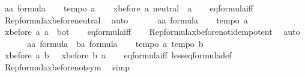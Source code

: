 \begin{isabellebody}
\ a{\isacharcolon}{\isacharcolon}{\isachardoublequoteopen}{\isacharprime}a\ formula{\isachardoublequoteclose}\isanewline
\ \ \isamarkupfalse%
\ {\isachardoublequoteopen}tempo{}\ a{\isachardoublequoteclose}\isanewline
\ \ \isamarkupfalse%
\ {\isachardoublequoteopen}xbefore\ a\ neutral\ {\isacharequal}\ a{\isachardoublequoteclose}\isanewline
\ \ \isamarkupfalse%
\ eq{\isacharunderscore}formula{\isacharunderscore}iff\isanewline
\ \ \isamarkupfalse%
\ Rep{\isacharunderscore}formula{\isacharunderscore}xbefore{\isacharunderscore}neutral{\isacharunderscore}{}\ \isamarkupfalse%
\ auto\isanewline
\ \ \isamarkupfalse%
\isanewline
\ \ \isamarkupfalse%
\ a{\isacharcolon}{\isacharcolon}{\isachardoublequoteopen}{\isacharprime}a\ formula{\isachardoublequoteclose}\isanewline
\ \ \isamarkupfalse%
\ {\isachardoublequoteopen}tempo{}\ a{\isachardoublequoteclose}\isanewline
\ \ \isamarkupfalse%
\ {\isachardoublequoteopen}xbefore\ a\ a\ {\isacharequal}\ bot{\isachardoublequoteclose}\isanewline
\ \ \isamarkupfalse%
\ eq{\isacharunderscore}formula{\isacharunderscore}iff\isanewline
\ \ \isamarkupfalse%
\ Rep{\isacharunderscore}formula{\isacharunderscore}xbefore{\isacharunderscore}not{\isacharunderscore}idempotent\ \isamarkupfalse%
\ auto\isanewline
\ \ \isamarkupfalse%
\isanewline
\ \ \isamarkupfalse%
\ a{\isacharcolon}{\isacharcolon}{\isachardoublequoteopen}{\isacharprime}a\ formula{\isachardoublequoteclose}\ \ b{\isacharcolon}{\isacharcolon}{\isachardoublequoteopen}{\isacharprime}a\ formula{\isachardoublequoteclose}\isanewline
\ \ \isamarkupfalse%
\ {\isachardoublequoteopen}tempo{}\ a{\isachardoublequoteclose}\ {\isachardoublequoteopen}tempo{}\ b{\isachardoublequoteclose}\isanewline
\ \ \isamarkupfalse%
\ {\isachardoublequoteopen}xbefore\ a\ b\ {\isasymle}\ {\isacharminus}\ xbefore\ b\ a{\isachardoublequoteclose}\isanewline
\ \ \isamarkupfalse%
\ eq{\isacharunderscore}formula{\isacharunderscore}iff\ less{\isacharunderscore}eq{\isacharunderscore}formula{\isacharunderscore}def\isanewline
\ \ \isamarkupfalse%
\ Rep{\isacharunderscore}formula{\isacharunderscore}xbefore{\isacharunderscore}not{\isacharunderscore}sym\ \isamarkupfalse%
\ simp\ \isanewline
\ \ \isamarkupfalse%

\end{isabellebody}
